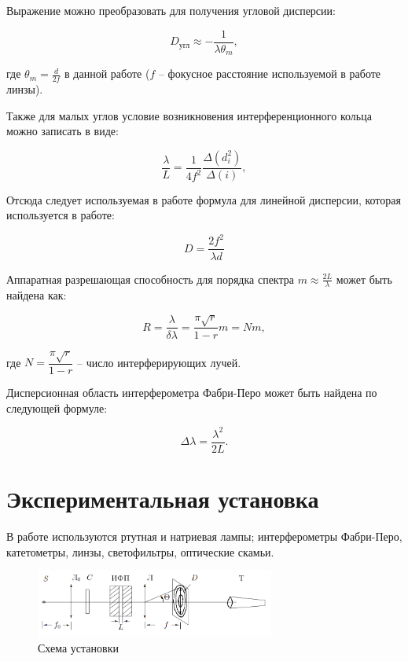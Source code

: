 \documentclass[a4paper,12pt]{article}
\begin{document}
Выражение можно преобразовать для получения угловой дисперсии:

\begin{equation}
    D_{\text{угл}} \approx -\frac{1}{\lambda \theta_{m}},
\end{equation}

где $\theta_{m} = \frac{d}{2f}$ в данной работе ($f$ -- фокусное расстояние используемой в работе линзы).

Также для малых углов условие возникновения  интерференционного кольца можно записать в виде:

\begin{equation}
    \frac{\lambda}{L} = \frac{1}{4f^2}\frac{\Delta(d^2_i)}{\Delta(i)},
\end{equation}

Отсюда следует используемая в работе формула для линейной дисперсии, которая используется в работе:

\begin{equation}
    D = \frac{2f^{2}}{\lambda d}
\end{equation}

Аппаратная разрешающая способность для порядка спектра $m \approx \frac{2L}{\lambda}$ может быть найдена как:

\begin{equation}
    R = \frac{\lambda}{\delta \lambda} = \frac{\pi \sqrt{r}}{1 - r}m = Nm,
\end{equation}

где $N = \dfrac{\pi \sqrt{r}}{1 - r}$ -- число интерферирующих лучей.

Дисперсионная область интерферометра Фабри-Перо может быть найдена по следующей формуле:

\begin{equation}
    \Delta \lambda = \frac{\lambda^{2}}{2L}.
\end{equation}

\section{Экспериментальная установка}

В работе используются ртутная и натриевая лампы; интерферометры Фабри-Перо,
катетометры, линзы, светофильтры, оптические скамьи.

\FloatBarrier
\begin{figure}[htbp]
    \centerline{\includegraphics[width=0.7\textwidth]{ust.png}}
    \caption[]{\label{fig:scheme} Схема установки}
\end{figure}
\FloatBarrier
\end{document}
